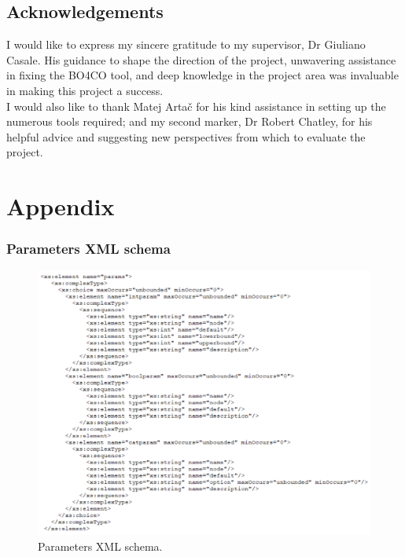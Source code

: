 \subsection{Acknowledgements}
I would like to express my sincere gratitude to my supervisor, Dr Giuliano Casale. His guidance to shape the direction of the project, unwavering assistance in fixing the BO4CO tool, and deep knowledge in the project area was invaluable in making this project a success.\\
I would also like to thank Matej Artač for his kind assistance in setting up the numerous tools required; and my second marker, Dr Robert Chatley, for his helpful advice and suggesting new perspectives from which to evaluate the project.

\newpage
\section{Appendix}
\subsubsection{Parameters XML schema}
\begin{figure}[h]
\centering
\caption{Parameters XML schema.}
\label{fig:schema}
\includegraphics[width=\textwidth]{images/schema.png}
\end{figure}
\newpage
